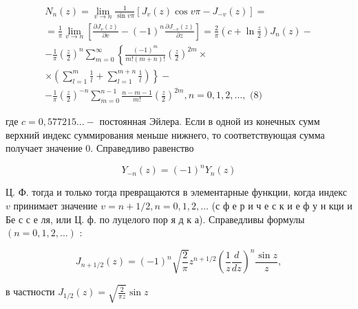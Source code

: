 \documentclass[10pt]{article}
\begin{document}
\[

\begin{gathered}

N_{n}(z)=\lim _{v \rightarrow n} \frac{1}{\sin v \pi}\left[J_{v}(z) \cos v \pi-J_{-v}(z)\right]= \\

=\frac{1}{\pi} \lim _{v \rightarrow n}\left[\frac{\partial J_{v}(z)}{\partial v}-(-1)^{n} \frac{\partial J_{-v}(z)}{\partial z}\right]=\frac{2}{\pi}\left(c+\ln \frac{z}{2}\right) J_{n}(z)- \\

-\frac{1}{\pi}\left(\frac{z}{2}\right)^{n} \sum_{m=0}^{\infty}\left\{\frac{(-1)^{m}}{m !(m+n) !}\left(\frac{z}{2}\right)^{2 m} \times\right. \\

\left.\times\left(\sum_{l=1}^{m} \frac{1}{l}+\sum_{l=1}^{m+n} \frac{1}{l}\right)\right\}- \\

-\frac{1}{\pi}\left(\frac{z}{2}\right)^{-n} \sum_{m=0}^{n-1} \frac{n-m-1}{m !}\left(\frac{z}{2}\right)^{2 m}, n=0,1,2, \ldots, \text { (8) }

\end{gathered}

\]



где $c=0,577215 \ldots-$ постоянная Эйлера. Если в одной из конечных сумм верхний индекс суммирования меньше нижнего, то соответствующая сумма получает значение 0. Справедливо равенство



\[

Y_{-n}(z)=(-1)^{n} Y_{n}(z)

\]



Ц. Ф. тогда и только тогда превращаются в элементарные функции, когда индекс $v$ принимает значение $v=n+1 / 2, n=0,1,2, \ldots$ (с ф е р и ч е с к и е ф у н кци и Бе с с е ля, или Ц. ф. по луцелого пор я д к а). Справедливы формулы $(n=0,1,2, \ldots)$ :



\[

J_{n+1 / 2}(z)=(-1)^{n} \sqrt{\frac{2}{\pi}} z^{n+1 / 2}\left(\frac{1}{z} \frac{d}{d z}\right)^{n} \frac{\sin z}{z},

\]



в частности $J_{1 / 2}(z)=\sqrt{\frac{\overline{2}}{\pi z}} \sin z$
\end{document}
